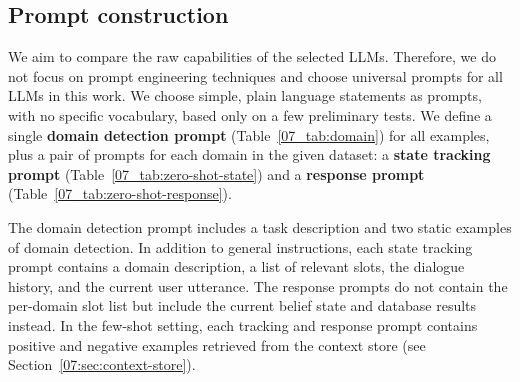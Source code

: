 \subsection{Prompt construction}
\label{07:sec:prompts}
We aim to compare the raw capabilities of the selected LLMs.
Therefore, we do not focus on prompt engineering techniques and choose universal prompts for all LLMs in this work.
We choose simple, plain language statements as prompts, with no specific vocabulary, based only on a few preliminary tests.
We define a single \textbf{domain detection prompt} (Table~\ref{07_tab:domain}) for all examples, plus a pair of prompts for each domain in the given dataset: a \textbf{state tracking prompt} (Table~\ref{07_tab:zero-shot-state}) and a \textbf{response prompt} (Table~\ref{07_tab:zero-shot-response}).

The domain detection prompt includes a task description and two static examples of domain detection.
In addition to general instructions, each state tracking prompt contains a domain description, a list of relevant slots, the dialogue history, and the current user utterance.
The response prompts do not contain the per-domain slot list but include the current belief state and database results instead.
In the few-shot setting, each tracking and response prompt contains positive and negative examples retrieved from the context store (see Section~\ref{07:sec:context-store}).

